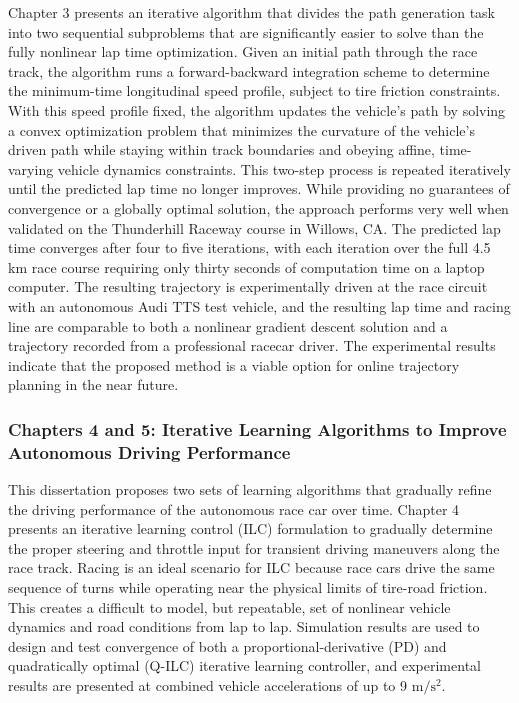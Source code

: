  Chapter 3 presents an iterative algorithm that divides the path generation
 task into two sequential subproblems that are significantly easier to solve than the fully nonlinear lap time optimization. Given an initial path through the race track, the algorithm
 runs a forward-backward integration scheme to determine the minimum-time longitudinal speed profile, subject to
 tire friction constraints. With this speed profile fixed, the algorithm updates the vehicle's path by solving a convex optimization problem 
 that minimizes the curvature of the vehicle's driven path while staying within track boundaries and obeying affine, time-varying vehicle dynamics constraints.
 This two-step process is repeated iteratively until the
 predicted lap time no longer improves. While providing no guarantees of convergence or a globally optimal solution, 
 the approach performs very well when validated on the Thunderhill Raceway
 course in Willows, CA. The predicted lap time converges after four to five iterations, with each iteration over the full 4.5 km race course requiring
 only thirty seconds of computation time on a laptop computer. The resulting trajectory is experimentally driven at the race circuit with
 an autonomous Audi TTS test vehicle, and the resulting lap time and racing line are comparable to both a nonlinear gradient
 descent solution and a trajectory recorded from a professional racecar driver. The experimental results indicate that the proposed method is a viable option for 
 online trajectory planning in the near future.
 
 \subsubsection{Chapters 4 and 5: Iterative Learning Algorithms to Improve Autonomous Driving Performance}
 
This dissertation proposes two sets of learning algorithms that gradually refine the driving performance of the autonomous race car 
over time. Chapter 4 presents an iterative learning control (ILC) formulation to gradually determine the proper steering 
and throttle input for transient driving maneuvers along the race track. Racing is an ideal scenario for ILC because race cars 
drive the same sequence of turns while operating near the physical limits of tire-road friction. 
This creates a difficult to model, but repeatable, set of nonlinear vehicle dynamics and road conditions from lap to lap. 
Simulation results are used to design and test convergence of both a 
 proportional-derivative (PD) and quadratically optimal (Q-ILC) iterative learning controller, and 
experimental results are presented at combined vehicle accelerations 
of up to 9 $\mathrm{m/s^2}$.

